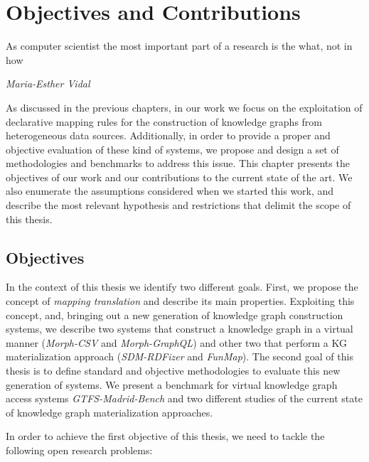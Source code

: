 \chapter{Objectives and Contributions}

\epigraph{As computer scientist the most important part of a research is the what, not in how}{\textit{Maria-Esther Vidal}}

\label{chap:objectives}
As discussed in the previous chapters, in our work we focus on the exploitation of declarative mapping rules for the construction of knowledge graphs from heterogeneous data sources. Additionally, in order to provide a proper and objective evaluation of these kind of systems, we propose and design a set of methodologies and benchmarks to address this issue. This chapter presents the objectives of our work and our contributions to the current state of the art. We also enumerate the assumptions considered when we started this work, and describe the most relevant hypothesis and restrictions that delimit the scope of this thesis.

\section{Objectives}
In the context of this thesis we identify two different goals. First, we propose the concept of \textit{mapping translation} and describe its main properties. Exploiting this concept, and, bringing out a new generation of knowledge graph construction systems, we describe two systems that construct a knowledge graph in a virtual manner (\textit{Morph-CSV} and \textit{Morph-GraphQL}) and other two that perform a KG materialization approach (\textit{SDM-RDFizer} and \textit{FunMap}). The second goal of this thesis is to define standard and objective methodologies to evaluate this new generation of systems. We present a benchmark for virtual knowledge graph access systems \textit{GTFS-Madrid-Bench} and two different studies of the current state of knowledge graph materialization approaches.

In order to achieve the first objective of this thesis, we need to tackle the following open research problems:

